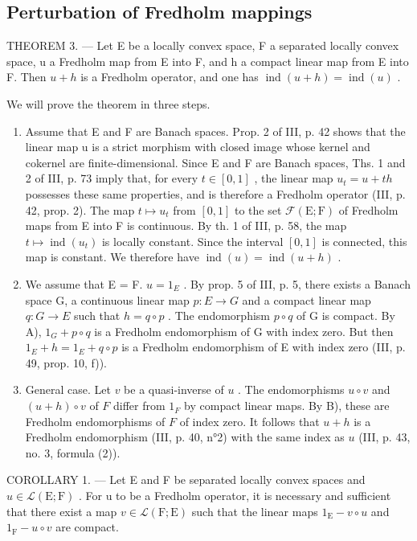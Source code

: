 \subsection{Perturbation of Fredholm mappings}

THEOREM 3. --- Let E be a locally convex space, F a separated locally convex space, u a Fredholm map from E into F, and h a compact linear map from E into F. Then \(u + h\) is a Fredholm operator, and one has \(\operatorname{ind}(u + h) = \operatorname{ind}(u)\) .

We will prove the theorem in three steps.

\begin{enumerate}
\def\labelenumi{\Alph{enumi})}
\item
  Assume that E and F are Banach spaces. Prop. 2 of III, p. 42 shows that the linear map u is a strict morphism with closed image whose kernel and cokernel are finite-dimensional. Since E and F are Banach spaces, Ths. 1 and 2 of III, p. 73 imply that, for every \(t \in [0,1]\) , the linear map \(u_t = u + th\) possesses these same properties, and is therefore a Fredholm operator (III, p. 42, prop. 2). The map \(t \mapsto u_t\) from \([0,1]\) to the set \(\mathcal{F}(\mathrm{E};\mathrm{F})\) of Fredholm maps from E into F is continuous. By th. 1 of III, p. 58, the map \(t \mapsto \operatorname{ind}(u_t)\) is locally constant. Since the interval \([0,1]\) is connected, this map is constant. We therefore have \(\operatorname{ind}(u) = \operatorname{ind}(u + h)\) .
\item
  We assume that E = F. \(u = 1_{E}\) . By prop. 5 of III, p. 5, there exists a Banach space G, a continuous linear map \(p: E \to G\) and a compact linear map \(q: G \to E\) such that \(h = q \circ p\) . The endomorphism \(p \circ q\) of G is compact. By A), \(1_{G} + p \circ q\) is a Fredholm endomorphism of G with index zero. But then \(1_{E} + h = 1_{E} + q \circ p\) is a Fredholm endomorphism of E with index zero (III, p. 49, prop. 10, f)).
\item
  General case. Let \(v\) be a quasi-inverse of \(u\) . The endomorphisms \(u \circ v\) and \((u + h) \circ v\) of \(F\) differ from \(1_{F}\) by compact linear maps. By B), these are Fredholm endomorphisms of \(F\) of index zero. It follows that \(u + h\) is a Fredholm endomorphism (III, p. 40, n°2) with the same index as \(u\) (III, p. 43, no. 3, formula (2)).
\end{enumerate}

COROLLARY 1. --- Let E and F be separated locally convex spaces and \(u \in \mathcal{L}(\mathrm{E};\mathrm{F})\) . For u to be a Fredholm operator, it is necessary and sufficient that there exist a map \(v \in \mathcal{L}(\mathrm{F};\mathrm{E})\) such that the linear maps \(1_{\mathrm{E}} - v \circ u\) and \(1_{\mathrm{F}} - u \circ v\) are compact.

